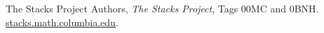 The Stacks Project Authors, \emph{The Stacks Project},
Tags 00MC and 0BNH.
\href{https://stacks.math.columbia.edu/}{stacks.math.columbia.edu}.
